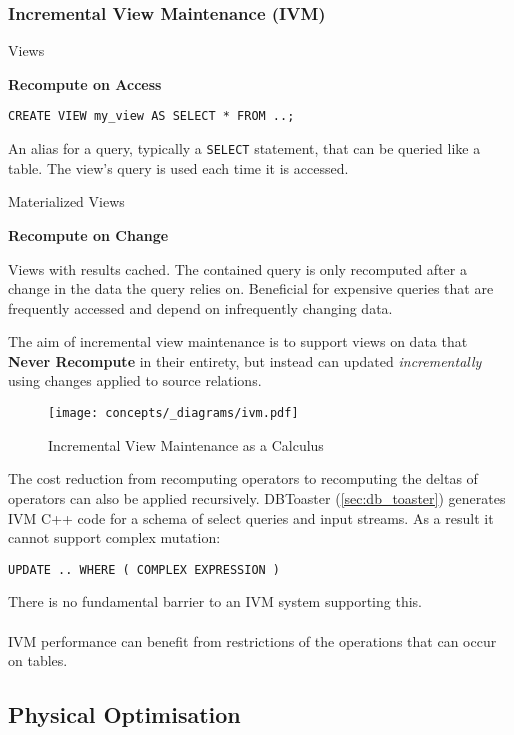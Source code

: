 \subsubsection{Incremental View Maintenance (IVM)}
\begin{tcbraster}[raster columns=2,raster equal height]
    \begin{definitionbox}{Views}
        \centerline{\textbf{Recompute on Access}}
        \begin{verbatim}
CREATE VIEW my_view AS SELECT * FROM ..;            
        \end{verbatim}
        An alias for a query, typically a \texttt{SELECT} statement, that can be queried like a table. The view's query is used each time it is accessed.\cite{Postgres16Docs}
    \end{definitionbox}
    \begin{definitionbox}{Materialized Views}
        \centerline{\textbf{Recompute on Change}}
        Views with results cached. The contained query is only recomputed after a change in the data the query relies on. Beneficial for expensive queries that are frequently accessed and depend on infrequently changing data.
    \end{definitionbox}
\end{tcbraster}
\noindent
The aim of incremental view maintenance is to support views on data that \textbf{Never Recompute} in their entirety, but instead can updated \textit{incrementally} using changes applied to source relations.
\begin{figure}[h!]
    \centering
    \texttt{[image: concepts/\_diagrams/ivm.pdf]}
    \caption{Incremental View Maintenance as a Calculus}
\end{figure}
\noindent
The cost reduction from recomputing operators to recomputing the deltas of operators can also be applied recursively. 
DBToaster (\ref{sec:db_toaster}) generates IVM C++ code for a schema of select queries and input streams. As a 
result it cannot support complex mutation:
\begin{verbatim}
UPDATE .. WHERE ( COMPLEX EXPRESSION )
\end{verbatim}
\noindent
There is no fundamental barrier to an IVM system supporting this.
\\
\\ IVM performance can benefit from restrictions of the operations that can occur on tables.
\subsection{Physical Optimisation}
